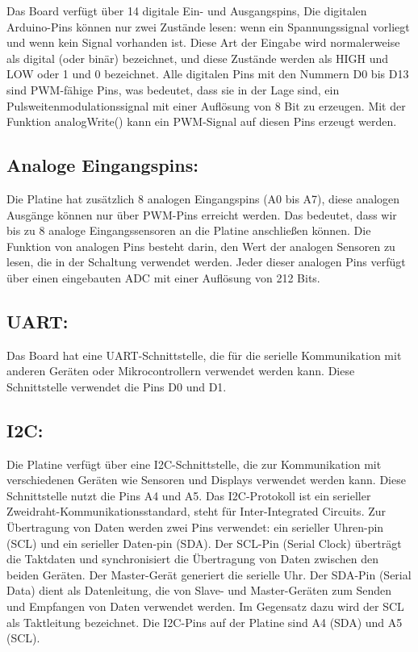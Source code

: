 Das Board verfügt über 14 digitale Ein- und Ausgangspins, Die digitalen Arduino-Pins können nur zwei Zustände lesen: wenn ein Spannungssignal vorliegt und wenn kein Signal vorhanden ist. Diese Art der Eingabe wird normalerweise als digital (oder binär) bezeichnet, und diese Zustände werden als HIGH und LOW oder 1 und 0 bezeichnet.
Alle digitalen Pins mit den Nummern D0 bis D13 sind PWM-fähige Pins, was bedeutet, dass sie in der Lage sind, ein Pulsweitenmodulationssignal mit einer Auflösung von 8 Bit zu erzeugen. Mit der Funktion analogWrite() kann ein PWM-Signal auf diesen Pins erzeugt werden.\cite{eTech.2021}\cite{ArdSense.2023}

\subsection{Analoge Eingangspins:}
Die Platine hat zusätzlich 8 analogen Eingangspins (A0 bis A7), diese analogen Ausgänge können nur über PWM-Pins erreicht werden. Das bedeutet, dass wir bis zu 8 analoge Eingangssensoren an die Platine anschließen können. Die Funktion von analogen Pins besteht darin, den Wert der analogen Sensoren zu lesen, die in der Schaltung verwendet werden. Jeder dieser analogen Pins verfügt über einen eingebauten ADC mit einer Auflösung von 212 Bits.

\subsection{UART:}
Das Board hat eine UART-Schnittstelle, die für die serielle Kommunikation mit anderen Geräten oder Mikrocontrollern verwendet werden kann. Diese Schnittstelle verwendet die Pins D0 und D1.

\subsection{I2C:}
Die Platine verfügt über eine I2C-Schnittstelle, die zur Kommunikation mit verschiedenen Geräten wie Sensoren und Displays verwendet werden kann. Diese Schnittstelle nutzt die Pins A4 und A5. Das I2C-Protokoll ist ein serieller Zweidraht-Kommunikationsstandard, steht für Inter-Integrated Circuits. Zur Übertragung von Daten werden zwei Pins verwendet: ein serieller Uhren-pin (SCL) und ein serieller Daten-pin (SDA). Der SCL-Pin (Serial Clock) überträgt die Taktdaten und synchronisiert die Übertragung von Daten zwischen den beiden Geräten. Der Master-Gerät generiert die serielle Uhr. Der SDA-Pin (Serial Data) dient als Datenleitung, die von Slave- und Master-Geräten zum Senden und Empfangen von Daten verwendet werden. Im Gegensatz dazu wird der SCL als Taktleitung bezeichnet. Die I2C-Pins auf der Platine sind A4 (SDA) und A5 (SCL). 
